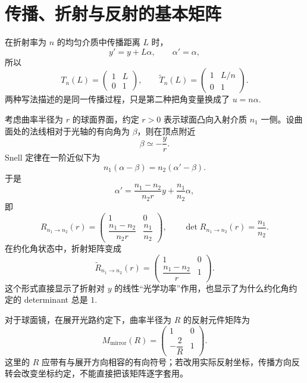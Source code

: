 \section{传播、折射与反射的基本矩阵}

在折射率为 \(n\) 的均匀介质中传播距离 \(L\) 时，
\begin{equation}
	y'=y+L\alpha,\qquad \alpha'=\alpha,
\end{equation}
所以
\begin{equation}
	T_n(L)=
	\begin{pmatrix}
		1&L\\0&1
	\end{pmatrix},
\qquad
\widetilde T_n(L)=
	\begin{pmatrix}
		1&L/n\\0&1
	\end{pmatrix}.
\end{equation}
两种写法描述的是同一传播过程，只是第二种把角变量换成了 \(u=n\alpha\).

考虑曲率半径为 \(r\) 的球面界面，约定 \(r>0\) 表示球面凸向入射介质 \(n_1\) 一侧。设曲面处的法线相对于光轴的有向角为 \(\beta\)，则在顶点附近
\begin{equation}
	\beta\simeq-\frac{y}{r}.
\end{equation}
Snell 定律在一阶近似下为
\begin{equation}
	n_1(\alpha-\beta)=n_2(\alpha'-\beta).
\end{equation}
于是
\begin{equation}
	\alpha'=\frac{n_1-n_2}{n_2r}y+\frac{n_1}{n_2}\alpha,
\end{equation}
即
\begin{equation}
	R_{n_1\to n_2}(r)=
	\begin{pmatrix}
		1&0\\[2pt]
		\dfrac{n_1-n_2}{n_2r}&\dfrac{n_1}{n_2}
	\end{pmatrix},
\qquad
\det R_{n_1\to n_2}(r)=\frac{n_1}{n_2}.
\end{equation}
在约化角状态中，折射矩阵变成
\begin{equation}
	\widetilde R_{n_1\to n_2}(r)=
	\begin{pmatrix}
		1&0\\[2pt]
		\dfrac{n_1-n_2}{r}&1
	\end{pmatrix}.
\end{equation}
这个形式直接显示了折射对 \(y\) 的线性“光学功率”作用，也显示了为什么约化角约定的 determinant 总是 \(1\).

对于球面镜，在展开光路约定下，曲率半径为 \(R\) 的反射元件矩阵为
\begin{equation}
	M_{\mathrm{mirror}}(R)=
	\begin{pmatrix}
		1&0\\[2pt]
		-\dfrac{2}{R}&1
	\end{pmatrix}.
\end{equation}
这里的 \(R\) 应带有与展开方向相容的有向符号；若改用实际反射坐标，传播方向反转会改变坐标约定，不能直接把该矩阵逐字套用。

